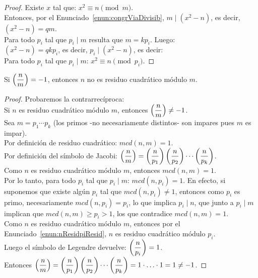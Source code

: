\begin{proof}
Existe $x$ tal que: $x^2 \equiv n \pmod m$. \\
Entonces, por el Enunciado~\ref{enun:congrViaDivisib}, $m \mid (x^2 - n)$, es decir, $(x^2 - n)=qm$. \\
Para todo $p_i$ tal que $p_i \mid m$ resulta que $m=kp_i$. Luego: \\
$(x^2 - n)=qkp_i$, es decir, $p_i \mid (x^2 - n)$, es decir: \\
Para todo $p_i$ tal que $p_i \mid m$: $x^2 \equiv n \pmod {p_i}$.
\end{proof}

\begin{enunciado} Si $\left(\dfrac{n}{m}\right) = -1$, entonces $n$ no es residuo cuadrático módulo $m$.
\end{enunciado}

\begin{proof}
Probaremos la contrarrecíproca: \\
Si $n$ es residuo cuadrático módulo $m$, entonces $\left(\dfrac{n}{m}\right) \neq -1$. \\
Sea $m = p_1 \cdots p_k$ (los primos -no necesariamente distintos- son impares pues $m$ es impar). \\
Por definición de residuo cuadrático: $mcd(n,m)=1$. \\
Por definición del símbolo de Jacobi: $\left(\dfrac{n}{m}\right) = \left(\dfrac{n}{p_1}\right) \left(\dfrac{n}{p_2}\right) \cdots \left(\dfrac{n}{p_k}\right)$. \\
Como $n$ es residuo cuadrático módulo $m$, entonces $mcd(n,m)=1$. \\
Por lo tanto, para todo $p_i$ tal que $p_i \mid m$: $mcd(n,p_i)=1$. En efecto, si suponemos que existe algún $p_i$ tal que $mcd(n,p_i) \neq 1$, entonces como $p_i$ es primo, necesariamente $mcd(n,p_i)=p_i$, lo que implica $p_i \mid n$, que junto a $p_i \mid m$ implican que $mcd(n,m) \geq p_i >1$, los que contradice $mcd(n,m)=1$. \\
Como $n$ es residuo cuadrático módulo $m$, entonces por el Enunciado~\ref{enun:nResidpiResid}, $n$ es residuo cuadrático módulo $p_i$. \\
Luego el símbolo de Legendre devuelve: $\left(\dfrac{n}{p_i}\right) = 1$. \\
Entonces $\left(\dfrac{n}{m}\right) = \left(\dfrac{n}{p_1}\right) \left(\dfrac{n}{p_2}\right) \cdots \left(\dfrac{n}{p_k}\right) = 1 \cdot \ldots \cdot 1 = 1 \neq -1$.
\end{proof}

